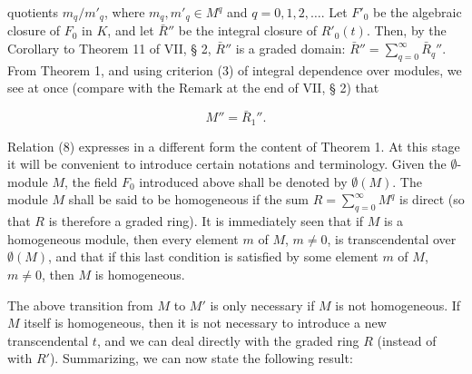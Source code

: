 quotients $m_q/m'_q$, where $m_q, m'_q \in M^q$ and $q=0, 1, 2, \ldots$. Let $F'_0$ be the algebraic closure of $F_0$ in $K$, and let $\bar{R}''$ be the integral closure of $R'_0(t)$. Then, by the Corollary to Theorem 11 of VII, § 2, $\bar{R}''$ is a graded domain: $\bar{R}'' = \sum_{q=0}^{\infty} \bar{R}_q''$. From Theorem 1, and using criterion (3) of integral dependence over modules, we see at once (compare with the Remark at the end of VII, § 2) that

$$M'' = \bar{R}_1''.$$

Relation (8) expresses in a different form the content of Theorem 1. At this stage it will be convenient to introduce certain notations and terminology. Given the $\emptyset$-module $M$, the field $F_0$ introduced above shall be denoted by $\emptyset(M)$. The module $M$ shall be said to be homogeneous if the sum $R = \sum_{q=0}^{\infty} M^q$ is direct (so that $R$ is therefore a graded ring). It is immediately seen that if $M$ is a homogeneous module, then every element $m$ of $M$, $m \neq 0$, is transcendental over $\emptyset(M)$, and that if this last condition is satisfied by some element $m$ of $M$, $m \neq 0$, then $M$ is homogeneous.

The above transition from $M$ to $M'$ is only necessary if $M$ is not homogeneous. If $M$ itself is homogeneous, then it is not necessary to introduce a new transcendental $t$, and we can deal directly with the graded ring $R$ (instead of with $R'$). Summarizing, we can now state the following result: